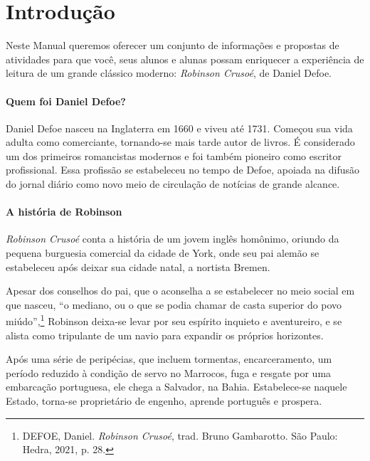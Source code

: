 \documentclass[12pt]{extarticle}
\begin{document}
\tableofcontents
{}\baselineskip\par


\section{Introdução}

Neste Manual queremos oferecer um conjunto de informações e propostas de
atividades para que você, seus alunos e alunas possam enriquecer a
experiência de leitura de um grande clássico moderno: \emph{Robinson
Crusoé}, de Daniel Defoe.

\paragraph{Quem foi Daniel Defoe?}
Daniel Defoe nasceu na Inglaterra em 1660 e viveu até 1731. Começou sua
vida adulta como comerciante, tornando-se mais tarde autor de livros. É
considerado um dos primeiros romancistas modernos e foi também pioneiro
como escritor profissional. Essa profissão se estabeleceu no tempo de
Defoe, apoiada na difusão do jornal diário como novo meio de circulação
de notícias de grande alcance.


\paragraph{A história de Robinson}
\emph{Robinson Crusoé} conta a história de um jovem inglês homônimo,
oriundo da pequena burguesia comercial da cidade de York, onde seu pai
alemão se estabeleceu após deixar sua cidade natal, a nortista Bremen.

Apesar dos conselhos do pai, que o aconselha a se estabelecer no meio
social em que nasceu, ``o mediano, ou o que se podia chamar de casta
superior do povo miúdo'',\footnote{DEFOE, Daniel. \emph{Robinson
  Crusoé}, trad. Bruno Gambarotto. São Paulo: Hedra, 2021, p. 28.}
Robinson deixa-se levar por seu espírito inquieto e aventureiro, e se
alista como tripulante de um navio para expandir os próprios horizontes.

Após uma série de peripécias, que incluem tormentas, encarceramento, um
período reduzido à condição de servo no Marrocos, fuga e resgate por uma
embarcação portuguesa, ele chega a Salvador, na Bahia. Estabelece-se
naquele Estado, torna-se proprietário de engenho, aprende português e
prospera.
\end{document}
